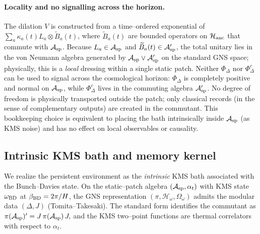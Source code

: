 \documentclass[10pt]{article}
\theoremstyle{definition}
\theoremstyle{plain}
\begin{document}
\paragraph{Locality and no signalling across the horizon.}\label{par:uom-main-219}
The dilation \(V\) is constructed from a time–ordered exponential of \(\sum_a \kappa_a(t)L_a\otimes \widetilde B_a(t)\), where \(\widetilde B_a(t)\) are bounded operators on \(\mathcal H_{\rm anc}\) that commute with \(\mathcal A_{\rm sp}\).
Because \(L_a\in\mathcal A_{\rm sp}\) and \(\widetilde B_a(t)\in\mathcal A'_{\rm sp}\), the total unitary lies in the von Neumann algebra generated by \(\mathcal A_{\rm sp}\vee \mathcal A'_{\rm sp}\) on the standard GNS space; physically, this is a \emph{local} dressing within a single static patch.
Neither \(\Phi_\Delta\) nor \(\Phi_\Delta^c\) can be used to signal across the cosmological horizon: \(\Phi_\Delta\) is completely positive and normal on \(\mathcal A_{\rm sp}\), while \(\Phi_\Delta^c\) lives in the commuting algebra \(\mathcal A'_{\rm sp}\).
No degree of freedom is physically transported outside the patch; only classical records (in the sense of complementary outputs) are created in the commutant.
This bookkeeping choice is equivalent to placing the bath intrinsically inside \(\mathcal A_{\rm sp}\) (as KMS noise) and has no effect on local observables or causality.

\subsection{Intrinsic KMS bath and memory kernel}\label{subsec:intrinsic-kms-bath}
We realize the persistent environment as the \emph{intrinsic} KMS bath associated with the Bunch–Davies state.
On the static–patch algebra \((\mathcal A_{\rm sp},\alpha_t)\) with KMS state \(\omega_{\rm BD}\) at \(\beta_{\rm BD}=2\pi/H\), the GNS representation \((\pi,\mathcal H_\omega,\Omega_\omega)\) admits the modular data \((\Delta,J)\) (Tomita–Takesaki).
The standard form identifies the commutant as
\(
\pi(\mathcal A_{\rm sp})' = J\,\pi(\mathcal A_{\rm sp})\,J,
\)
and the KMS two–point functions are thermal correlators with respect to \(\alpha_t\).
\end{document}
